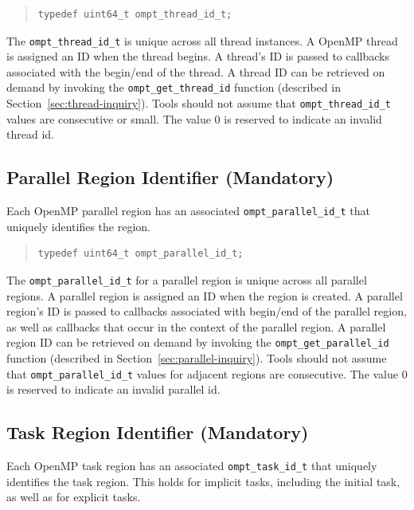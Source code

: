 \documentclass{article}
\begin{document}
\begin{quote}
\begin{verbatim}
typedef uint64_t ompt_thread_id_t;
\end{verbatim}
\end{quote}

\noindent
  The \verb|ompt_thread_id_t| is unique
  across all thread instances.  A OpenMP thread is assigned an ID
  when the thread begins. A thread's ID is
  passed to callbacks associated with the begin/end of the
  thread. A thread ID can be retrieved
  on demand by invoking the  \verb|ompt_get_thread_id|   
  function (described in Section~\ref{sec:thread-inquiry}).
  Tools should not assume that \verb|ompt_thread_id_t| values are consecutive or small. 
  The value 0 is reserved to indicate an invalid thread id.



\subsection{Parallel Region Identifier (Mandatory)}
  Each OpenMP parallel region has an associated
  \verb|ompt_parallel_id_t| that uniquely identifies the region.

\begin{quote}
\begin{verbatim}
typedef uint64_t ompt_parallel_id_t;
\end{verbatim}
\end{quote}

\noindent
  The \verb|ompt_parallel_id_t| for a parallel region is unique
  across all parallel regions.  A parallel region is assigned an ID
  when the region is created. A parallel region's ID is
  passed to callbacks associated with begin/end of the
  parallel region, as well as callbacks that occur in the context of the parallel region.
  A parallel region ID can be retrieved
  on demand by invoking the \verb|ompt_get_parallel_id|  function (described in Section~\ref{sec:parallel-inquiry}).
  Tools should not assume that \verb|ompt_parallel_id_t| values for adjacent
  regions are consecutive. 
  The value 0 is reserved to indicate an invalid parallel id.
 
 
  \subsection{Task Region Identifier (Mandatory)}
  Each OpenMP task region has an associated
  \verb|ompt_task_id_t| that uniquely identifies the task region. 
  This holds for implicit tasks, including the initial task, as well as for explicit tasks.
\end{document}

